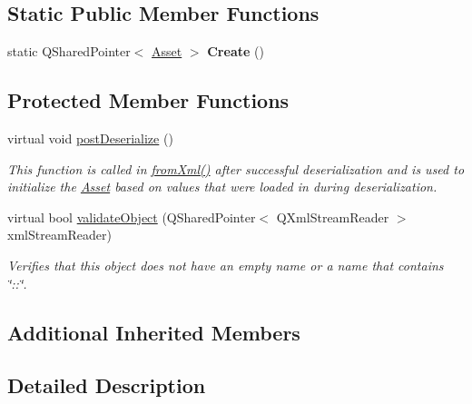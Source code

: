 \subsection*{Static Public Member Functions}
\begin{DoxyCompactItemize}
\item 
\hypertarget{class_picto_1_1_ender_container_a2968451719e17b7203d30a82950c5080}{static Q\-Shared\-Pointer$<$ \hyperlink{class_picto_1_1_asset}{Asset} $>$ {\bfseries Create} ()}\label{class_picto_1_1_ender_container_a2968451719e17b7203d30a82950c5080}

\end{DoxyCompactItemize}
\subsection*{Protected Member Functions}
\begin{DoxyCompactItemize}
\item 
virtual void \hyperlink{class_picto_1_1_ender_container_a7b56846cfdce3cd9ffe2efe2bea3b49f}{post\-Deserialize} ()
\begin{DoxyCompactList}\small\item\em This function is called in \hyperlink{class_picto_1_1_asset_a8bed4da09ecb1c07ce0dab313a9aba67}{from\-Xml()} after successful deserialization and is used to initialize the \hyperlink{class_picto_1_1_asset}{Asset} based on values that were loaded in during deserialization. \end{DoxyCompactList}\item 
\hypertarget{class_picto_1_1_ender_container_ac1a471ca77488321f1d4ac77e243c7c4}{virtual bool \hyperlink{class_picto_1_1_ender_container_ac1a471ca77488321f1d4ac77e243c7c4}{validate\-Object} (Q\-Shared\-Pointer$<$ Q\-Xml\-Stream\-Reader $>$ xml\-Stream\-Reader)}\label{class_picto_1_1_ender_container_ac1a471ca77488321f1d4ac77e243c7c4}

\begin{DoxyCompactList}\small\item\em Verifies that this object does not have an empty name or a name that contains \char`\"{}\-::\char`\"{}. \end{DoxyCompactList}\end{DoxyCompactItemize}
\subsection*{Additional Inherited Members}


\subsection{Detailed Description}


